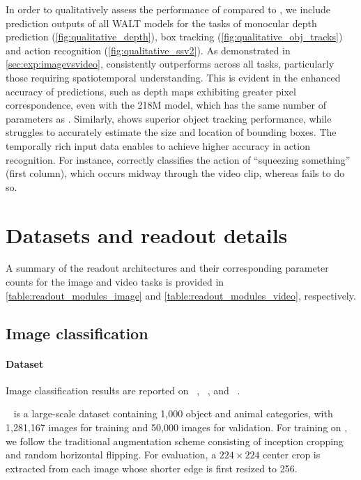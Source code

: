 In order to qualitatively assess the performance of \iwalt compared to \vwalt, we include prediction outputs of all WALT models for the tasks of monocular depth prediction (\cref{fig:qualitative_depth}), box tracking (\cref{fig:qualitative_obj_tracks}) and action recognition (\cref{fig:qualitative_ssv2}).
As demonstrated in \cref{sec:exp:imagevsvideo}, \vwalt consistently outperforms \iwalt across all tasks, particularly those requiring spatiotemporal understanding. This is evident in the enhanced accuracy of \vwalt predictions, such as depth maps exhibiting greater pixel correspondence, even with the \vwalt 218M model, which has the same number of parameters as \iwalt.  Similarly, \vwalt shows superior object tracking performance, while \iwalt struggles to accurately estimate the size and location of bounding boxes.  The temporally rich input data enables \vwalt to achieve higher accuracy in action recognition. For instance, \vwalt correctly classifies the action of ``squeezing something'' (first column), which occurs midway through the video clip, whereas \iwalt fails to do so.

\section{Datasets and readout details}
\label{app:sec:datasets}

 A summary of the readout architectures and their corresponding parameter counts for the image and video tasks is provided in \cref{table:readout_modules_image} and \cref{table:readout_modules_video}, respectively.


 




\subsection{Image classification}

\paragraph{Dataset}
Image classification results are reported on \Timagenet~\cite{imagenet}, \Tplaces~\cite{places365}, and \Tinat~\cite{inaturalist}.


\Timagenet ~\cite{imagenet} is a large-scale dataset containing 1,000 object and animal categories, with 1,281,167 images for training and 50,000 images for validation. For training on \Timagenet, we follow the traditional augmentation scheme consisting of inception cropping and random horizontal flipping. For evaluation, a $224\times224$ center crop is extracted from each image whose shorter edge is first resized to 256.

